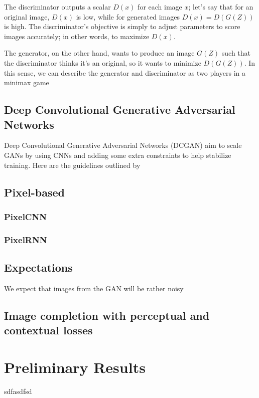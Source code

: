 \documentclass[10pt,twocolumn,letterpaper]{article}
\begin{document}
\par The discriminator outputs a scalar $D(x)$ for each image $x$; let's say that for an original image, $D(x)$ is low, while for generated images $D(x) = D(G(Z))$ is high. The discriminator's objective is simply to adjust parameters to score images accurately; in other words, to maximize $D(x)$.

The generator, on the other hand, wants to produce an image $G(Z)$ such that the discriminator thinks it's an original, so it wants to minimize $D(G(Z))$. In this sense, we can describe the generator and discriminator as two players in a minimax game \cite{GAN}



\subsection{Deep Convolutional Generative Adversarial Networks}
Deep Convolutional Generative Adversarial Networks (DCGAN) aim to scale GANs by using CNNs and adding some extra constraints to help stabilize training. Here are the guidelines outlined by 


\subsection{Pixel-based}
\subsubsection{PixelCNN}
\subsubsection{PixelRNN}

\subsection{Expectations}
We expect that images from the GAN will be rather noisy

\subsection{Image completion with perceptual and contextual losses}

\section{Preliminary Results}
sdfasdfsd \cite{Alpher02}
\end{document}
